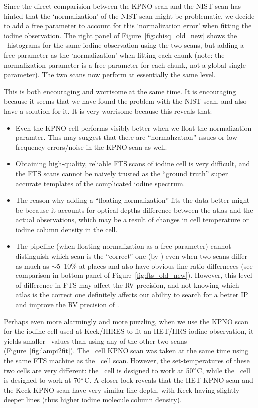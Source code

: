 Since the direct comparision between the KPNO scan and the NIST scan
has hinted that the `normalization' of the NIST scan might be
problematic, we decide to add a free parameter to account for this
`normalization error' when fitting the iodine observation. The right
panel of Figure~\ref{fig:chisq_old_new} shows the \chisq\ histograms
for the same iodine observation using the two scans, but adding a free
parameter as the `normalization' when fitting each chunk (note: the
normalization parameter is a free parameter for each chunk, not a
global single parameter). The two scans now perform at essentially the
same level.

This is both encouraging and worrisome at the same time. It is
encouraging because it seems that we have found the problem with the
NIST scan, and also have a solution for it. It is very worrisome
because this reveals that:
\begin{itemize}
  \item Even the KPNO cell performs visibly better when we float the
    normalization paramter. This may suggest that there are
    ``normalization'' issues or low frequency errors/noise in the KPNO
    scan as well.
  \item Obtaining high-quality, reliable FTS scans of iodine cell is
    very difficult, and the FTS scans cannot be naively trusted as the
    ``ground truth'' super accurate templates of the complicated iodine
    spectrum.
  \item The reason why adding a ``floating normalization'' fits the
    data better might be because it accounts for optical depths difference
    between the atlas and the actual observations, which may be a result
    of changes in cell temperature or iodine column density in the cell.
  \item The pipeline (when floating normalization as a free parameter)
    cannot distinguish which scan is the ``correct'' one (by \chisq)
    even when two scans differ as much as $\sim$5--10\% at places and
    also have obvious line ratio differneces (see comparison in bottom
    panel of Figure~\ref{fig:fts_old_new}). However, this level of
    difference in FTS may affect the RV precision, and not knowing
    which atlas is the correct one definitely affects our ability to
    search for a better IP and improve the RV precision of \het.
\end{itemize}  

Perhaps even more alarmingly and more puzzling, when we use the KPNO
scan for the iodine cell used at Keck/HIRES to fit an HET/HRS iodine
observation, it yields smaller \chisq\ values than using any of the
other two scans (Figure~\ref{fig:lampi2fit}). The \het\ cell KPNO scan
was taken at the same time using the same FTS machine as the \keck\
cell scan. However, the set-temperatures of these two cells are very
different: the \keck\ cell is designed to work at 50$^{\circ}$C, while
the \het\ cell is designed to work at $70^{\circ}$C. A closer look
reveals that the HET KPNO scan and the Keck KPNO scan have very
similar line depth, with Keck having slightly deeper lines (thus
higher iodine molecule column density).


